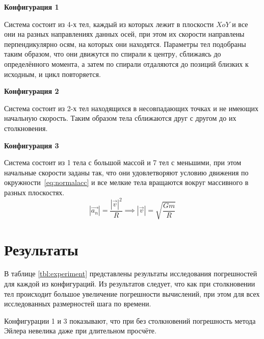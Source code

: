 \textbf{Конфигурация 1}

Система состоит из 4-х тел, каждый из которых лежит в плоскости $XoY$ и все они на разных направлениях данных осей, при этом их скорости направлены перпендикулярно осям, на которых они находятся. Параметры тел подобраны таким образом, что они движутся по спирали к центру, сближаясь до определённого момента, а затем по спирали отдаляются до позиций близких к исходным, и цикл повторяется.

\textbf{Конфигурация 2}

Система состоит из 2-х тел находящихся в несовпадающих точках и не имеющих начальную скорость. Таким образом тела сближаются друг с другом до их столкновения.

\textbf{Конфигурация 3}

Система состоит из 1 тела с большой массой и 7 тел с меньшими, при этом начальные скорости заданы так, что они удовлетворяют условию движения по окружности~\ref{eq:normalacc} и все мелкие тела вращаются вокруг массивного в разных плоскостях. 
\begin{equation}
	\label{eq:normalacc}
	|\vec{a_n}| = \frac{|\vec{v}|^2}{R} \implies |\vec{v}| = \sqrt{\frac{Gm}{R}}
\end{equation}

\section{Результаты}

В таблице \ref{tbl:experiment} представлены результаты исследования погрешностей для каждой из конфигураций. Из результатов следует, что как при столкновении тел происходит большое увеличение погрешности вычислений, при этом для всех исследованных размерностей шага по времени.

Конфигурации 1 и 3 показывают, что при без столкновений погрешность метода Эйлера невелика даже при длительном просчёте.

